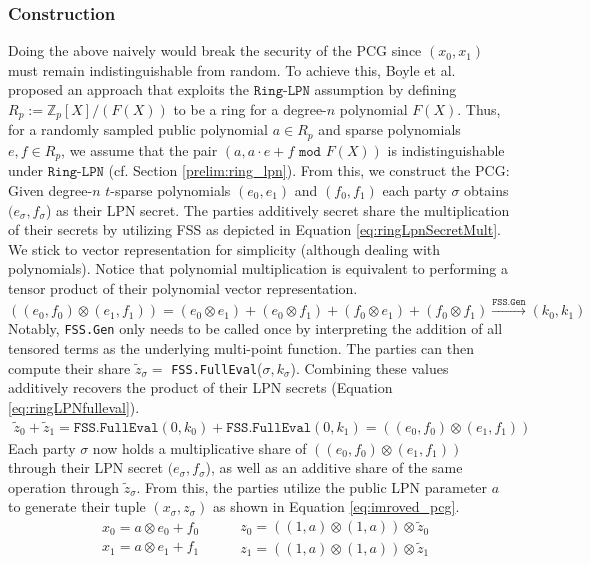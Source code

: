 \subsubsection{Construction}
Doing the above naively would break the security of the PCG since $(x_0, x_1)$ must remain indistinguishable from random. To achieve this, Boyle et al. \cite{boyle2020efficient} proposed an approach that exploits the $\texttt{Ring-LPN}$ assumption by defining $R_p:=\mathbb{Z}_{p}[X]/(F(X))$ to be a ring for a degree-$n$ polynomial $F(X)$. Thus, for a randomly sampled public polynomial $a \in R_p$ and sparse polynomials $e,f\in R_p$, we assume that the pair $(a, a\cdot e+f \texttt{ mod } F(X))$ is indistinguishable under $\texttt{Ring-LPN}$ (cf. Section \ref{prelim:ring_lpn}). From this, we construct the PCG: Given degree-$n$ $t$-sparse polynomials $(e_0, e_1)$ and $(f_0, f_1)$ each party $\sigma$ obtains $(e_\sigma, f_\sigma$) as their LPN secret. The parties additively secret share the multiplication of their secrets by utilizing FSS as depicted in Equation \ref{eq:ringLpnSecretMult}.  We stick to vector representation for simplicity (although dealing with polynomials). Notice that polynomial multiplication is equivalent to performing a tensor product of their polynomial vector representation. 
\begin{equation}
((e_0, f_0) \otimes (e_1, f_1)) = (e_0 \otimes e_1) + (e_0 \otimes f_1) + (f_0 \otimes e_1) + (f_0 \otimes f_1) \overset{\texttt{FSS.Gen}}{\longrightarrow} (k_0, k_1)
\label{eq:ringLpnSecretMult}
\end{equation}
Notably, \texttt{FSS.Gen} only needs to be called once by interpreting the addition of all tensored terms as the underlying multi-point function. The parties can then compute their share $\tilde{z}_\sigma =$ \texttt{FSS.FullEval}($\sigma, k_\sigma$). Combining these values additively recovers the product of their LPN secrets (Equation \ref{eq:ringLPNfulleval}).
\begin{equation}
\begin{aligned}
\tilde{z}_0 + \tilde{z}_1 = \texttt{FSS.FullEval}(0, k_0) + \texttt{FSS.FullEval}(0, k_1) = ((e_0, f_0) \otimes (e_1, f_1)) 
\label{eq:ringLPNfulleval}
\end{aligned}
\end{equation}
Each party $\sigma$ now holds a multiplicative share of $((e_0, f_0) \otimes (e_1, f_1))$ through their LPN secret $(e_\sigma, f_\sigma$), as well as an additive share of the same operation through  $\tilde{z}_\sigma$. From this, the parties utilize the public LPN parameter $a$ to generate their tuple $(x_\sigma, z_\sigma)$ as shown in Equation \ref{eq:imroved_pcg}.
\begin{equation}
\begin{aligned}
& x_0 = a\otimes e_0 + f_0 \\
& x_1 = a\otimes e_1 + f_1
\end{aligned}
\:\:\:\:\:\:
\begin{aligned}
& z_0 = ((1,a)\otimes(1,a)) \otimes \tilde{z}_0 \\
& z_1 = ((1,a)\otimes(1,a)) \otimes \tilde{z}_1 
\end{aligned}
\label{eq:imroved_pcg}
\end{equation}

